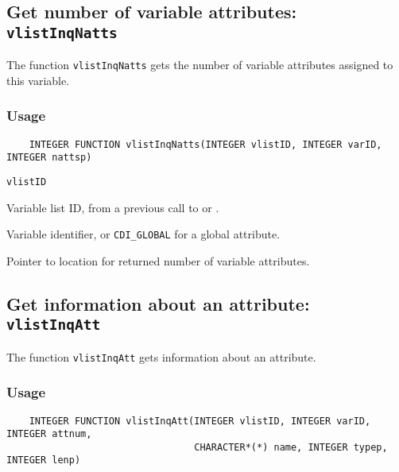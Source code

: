 

\subsection{Get number of variable attributes: {\tt vlistInqNatts}}
\label{vlistInqNatts}

The function {\tt vlistInqNatts} gets the number of variable attributes assigned to this variable.

\subsubsection*{Usage}

\begin{verbatim}
    INTEGER FUNCTION vlistInqNatts(INTEGER vlistID, INTEGER varID, INTEGER nattsp)
\end{verbatim}

\hspace*{4mm}\begin{minipage}[]{15cm}
\begin{deflist}{\tt vlistID\ }
\item[{\tt vlistID}]
Variable list ID, from a previous call to {} or {}.
\item[{\tt varID}]
Variable identifier, or {\tt CDI\_GLOBAL} for a global attribute.
\item[{\tt nattsp}]
Pointer to location for returned number of variable attributes.

\end{deflist}
\end{minipage}


\subsection{Get information about an attribute: {\tt vlistInqAtt}}
\label{vlistInqAtt}

The function {\tt vlistInqAtt} gets information about an attribute.

\subsubsection*{Usage}

\begin{verbatim}
    INTEGER FUNCTION vlistInqAtt(INTEGER vlistID, INTEGER varID, INTEGER attnum, 
                                 CHARACTER*(*) name, INTEGER typep, INTEGER lenp)
\end{verbatim}

